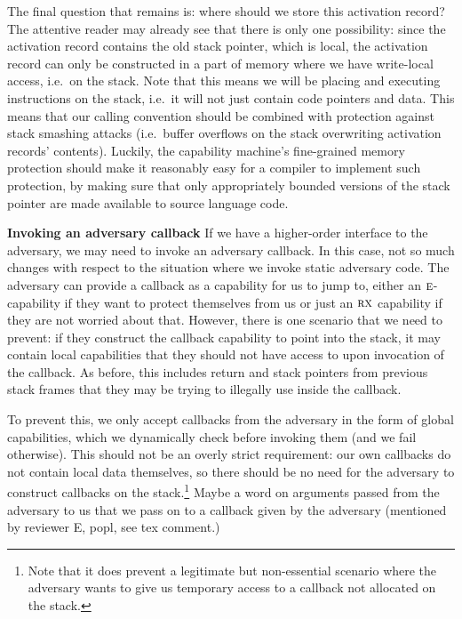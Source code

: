 \documentclass[format=acmsmall, review=false, screen=true]{acmart}
\newcommand{\plainperm}[1]{\textsc{#1}}
\newcommand{\exec}{\plainperm{rx}}
\newcommand{\entry}{\plainperm{e}}
\newcommand{\itoplassug}[1]
    {{\color{Blue} #1}}
\begin{document}
The final question that remains is: where should we store this activation
record? The attentive reader may already see that there is only one possibility:
since the activation record contains the old stack pointer, which is local, the
activation record can only be constructed in a part of memory where we have
write-local access, i.e.\ on the stack. Note that this means we will be placing
and executing instructions on the stack, i.e.\ it will not just contain code
pointers and data. This means that our calling convention should be combined
with protection against stack smashing attacks (i.e.\ buffer overflows on the
stack overwriting activation records' contents). Luckily, the capability
machine's fine-grained memory protection should make it reasonably easy for a
compiler to implement such protection, by making sure that only appropriately
bounded versions of the stack pointer are made available to source language
code.

\textbf{Invoking an adversary callback} If we have a higher-order interface to
the adversary, we may need to invoke an adversary callback. In this case, not so
much changes with respect to the situation where we invoke static adversary
code. The adversary can provide a callback as a capability for us to jump to,
either an $\entry$-capability if they want to protect themselves from us or just
an $\exec$ capability if they are not worried about that. However, there is one
scenario that we need to prevent: if they construct the callback capability to
point into the stack, it may contain local capabilities that they should not
have access to upon invocation of the callback. As before, this includes return
and stack pointers from previous stack frames that they may be
trying to illegally use inside the callback.

To prevent this, we only accept callbacks from the adversary in the form of
global capabilities, which we dynamically check before invoking them (and we
fail otherwise). This should not be an overly strict requirement: our own
callbacks do not contain local data themselves, so there should be no need for
the adversary to construct callbacks on the stack.\footnote{Note that it does
  prevent a legitimate but non-essential scenario where the adversary wants to
  give us temporary access to a callback not allocated on the stack.}
\itoplassug{Maybe a word on arguments passed from the adversary to us that we pass on to a callback given by the adversary (mentioned by reviewer E, popl, see tex comment.)}
\end{document}
